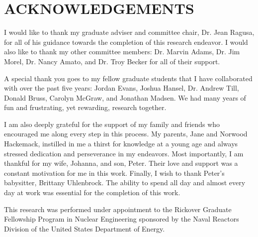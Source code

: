 %
%
%


\chapter*{ACKNOWLEDGEMENTS}


I would like to thank my graduate adviser and committee chair, Dr. Jean Ragusa, for all of his guidance towards the completion of this research endeavor. I would also like to thank my other committee members: Dr. Marvin Adams, Dr. Jim Morel, Dr. Nancy Amato, and Dr. Troy Becker for all of their support.

A special thank you goes to my fellow graduate students that I have collaborated with over the past five years: Jordan Evans, Joshua Hansel, Dr. Andrew Till, Donald Bruss, Carolyn McGraw, and Jonathan Madsen. We had many years of fun and frustrating, yet rewarding, research together.

I am also deeply grateful for the support of my family and friends who encouraged me along every step in this process. My parents, Jane and Norwood Hackemack, instilled in me a thirst for knowledge at a young age and always stressed dedication and perseverance in my endeavors. Most importantly, I am thankful for my wife, Johanna, and son, Peter. Their love and support was a constant motivation for me in this work. Finally, I wish to thank Peter's babysitter, Brittany Uhlenbrock. The ability to spend all day and almost every day at work was essential for the completion of this work.

This research was performed under appointment to the Rickover Graduate Fellowship Program in Nuclear Engineering sponsored by the Naval Reactors Division of the United States Department of Energy.


\pagebreak{}